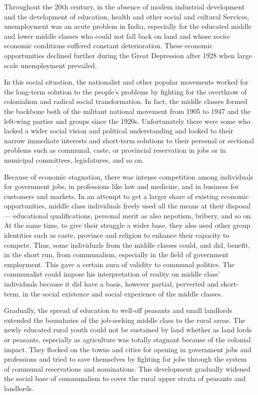 Throughout the 20th century, in the absence of modem industrial development and the development of education, health and other social and cultural Services, unemployment was an acute problem in India, especially for the educated middle and lower middle classes who could not fall back on land and whose socio-economic conditions suffered constant deterioration. These economic opportunities declined further during the Great Depression after 1928 when large scale unemployment prevailed. 

In this social situation, the nationalist and other popular movements worked for the long-term solution to the people's problems by fighting for the overthrow of colonialism and radical social transformation. In fact, the middle classes formed the backbone both of the militant national movement from 1905 to 1947 and the left-wing parties and groups since the 1920s. Unfortunately there were some who lacked a wider social vision and political understanding and looked to their narrow immediate interests and short-term solutions to their personal or sectional problems such as communal, caste, or provincial reservation in jobs or in municipal committees, legislatures, and so on. 

Because of economic stagnation, there was intense competition among individuals for government jobs, in professions like law and medicine, and in business for customers and markets. In an attempt to get a larger share of existing economic opportunities, middle class individuals freely used all the means at their disposal --- educational qualifications, personal merit as also nepotism, bribery, and so on. At the same time, to give their struggle a wider base, they also used other group identities such as caste, province and religion to enhance their capacity to compete. Thus, some individuals from the middle classes could, and did, benefit, in the short run, from communalism, especially in the field of government employment. This gave a certain aura of validity to communal politics. The communalist could impose his interpretation of reality on middle class' individuals because it did have a basis, however partial, perverted and short-term, in the social existence and social experience of the middle classes. 

Gradually, the spread of education to well-off peasants and small landlords extended the boundaries of the job-seeking middle class to the rural areas. The newly educated rural youth could not be sustained by land whether as land lords or peasants, especially as agriculture was totally stagnant because of the colonial impact. They flocked on the towns and cities for opening in government jobs and professions and tried to save themselves by fighting for jobs through the system of communal reservations and nominations. This development gradually widened the social base of communalism to cover the rural upper strata of peasants and landlords. 

